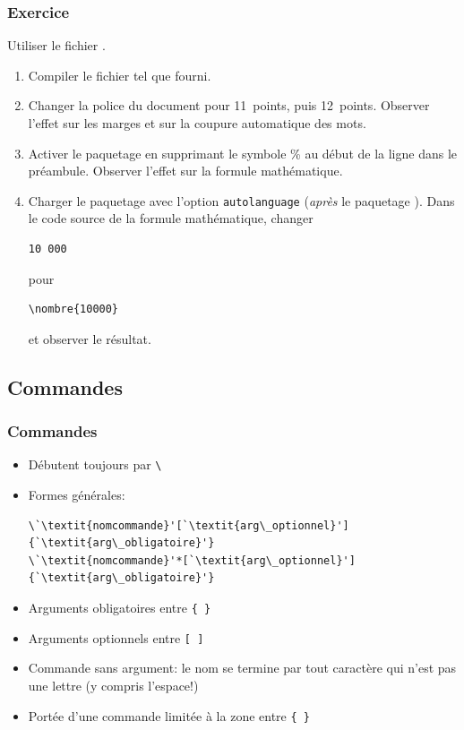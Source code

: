 \begin{frame}[fragile=singleslide]
  \frametitle{Exercice}

  Utiliser le fichier .

  \begin{enumerate}
  \item Compiler le fichier tel que fourni.
  \item Changer la police du document pour 11~points, puis 12~points.
    Observer l'effet sur les marges et sur la coupure automatique des
    mots.
  \item Activer le paquetage  en supprimant le symbole \%
    au début de la ligne dans le préambule. Observer l'effet sur la
    formule mathématique.
  \item Charger le paquetage  avec l'option
    \verb=autolanguage= (\emph{après} le paquetage ). Dans
    le code source de la formule mathématique, changer
\begin{lstlisting}
10 000
\end{lstlisting}
    pour
\begin{lstlisting}
\nombre{10000}
\end{lstlisting}
    et observer le résultat.
  \end{enumerate}
\end{frame}

\subsection{Commandes}

\begin{frame}[fragile=singleslide]
  \frametitle{Commandes}
  \begin{itemize}
  \item Débutent toujours par \verb=\=
  \item Formes générales:
\begin{lstlisting}
\`\textit{nomcommande}'[`\textit{arg\_optionnel}']{`\textit{arg\_obligatoire}'}
\`\textit{nomcommande}'*[`\textit{arg\_optionnel}']{`\textit{arg\_obligatoire}'}
\end{lstlisting}
  \item Arguments obligatoires entre \verb={ }=
  \item Arguments optionnels entre \verb=[ ]=
  \item Commande sans argument: le nom se termine par tout
    caractère qui n'est pas une lettre (y compris l'espace!)
  \item Portée d'une commande limitée à la zone entre \verb={ }=
  \end{itemize}
\end{frame}

